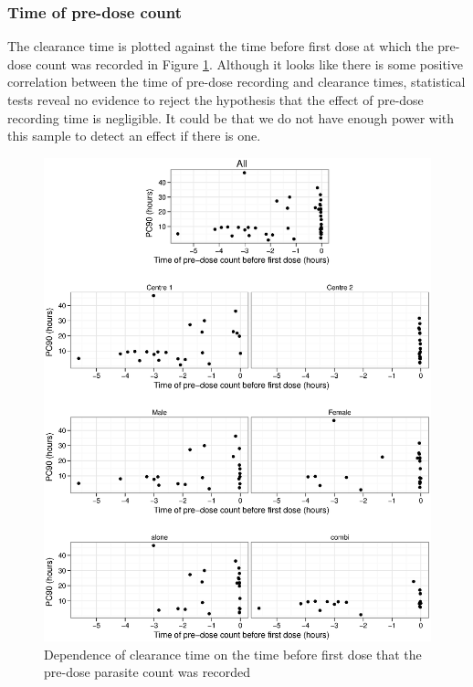 
\subsubsection*{Time of pre-dose count}\label{sec:pretimeancova}
The clearance time is plotted against the time before first dose at which the pre-dose count was recorded in Figure \ref{pretime-ancova}. Although it looks like there is some positive correlation between the time of pre-dose recording and clearance times, statistical tests reveal no evidence to reject the hypothesis that the effect of pre-dose recording time is negligible. It could be that we do not have enough power with this sample to detect an effect if there is one. 
\begin{figure}[p]
\includegraphics[width=150mm]{pretime-ancova.eps} 
\caption{Dependence of clearance time on the time before first dose that the pre-dose parasite count was recorded}
\label{pretime-ancova}
\end{figure}

